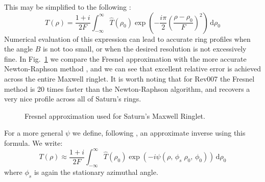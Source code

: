 \documentclass{article}
\theoremstyle{plain}
\begin{document}
        This may be simplified to the following
        \cite[Ch.~3, 13, 15]{BracewellFourierTransform}:
        \begin{equation}
            T(\rho)=\frac{1+i}{2F}\int_{-\infty}^{\infty}
                \hat{T}(\rho_{0})\exp\left(
                    -\frac{i\pi}{2}\left(\frac{\rho-\rho_{0}}{F}\right)^{2}
                \right)\,\textrm{d}\rho_{0}
        \end{equation}
        Numerical evaluation of this expression can lead to accurate
        ring profiles when the angle $B$ is not too small, or when the
        desired resolution is not excessively fine. In
        Fig.~\ref{fig:maxwell_ringlet_newton_vs_fresnel} we compare the
        Fresnel approximation with the more accurate Newton-Raphson method
        \cite[p.~161-162]{MTR86}, and we can see that excellent
        relative error is achieved across the entire Maxwell ringlet.
        It is worth noting that for Rev007 the Fresnel method is 20 times
        faster than the Newton-Raphson algorithm, and recovers a very nice
        profile across all of Saturn's rings.
        \begin{figure}
            \centering
            \label{fig:maxwell_ringlet_newton_vs_fresnel}
            \caption{Fresnel approximation used for Saturn's Maxwell Ringlet.}
        \end{figure}
        \par\hfill\par
        For a more general $\psi$ we define, following
        \cite[Eqn.~15]{MTR86}, an approximate inverse using this formula.
        We write:
        \begin{equation}
            \label{eqn:inverse_fresnel_transform}
            T(\rho)
            \approx\frac{1+i}{2F}\int_{-\infty}^{\infty}
                \hat{T}(\rho_{0})\exp\left(
                    -i\psi(\rho,\,\phi_{s}\;\rho_{0},\,\phi_{0})
                \right)\,\textrm{d}\rho_{0}
        \end{equation}
        where $\phi_{s}$ is again the stationary azimuthal angle.
\end{document}

